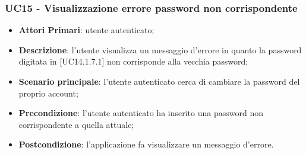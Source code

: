 \subsubsection{UC15 - Visualizzazione errore password non corrispondente}
\begin{itemize}
	\item \textbf{Attori Primari}: utente autenticato;
	\item \textbf{Descrizione}: l'utente visualizza un messaggio d'errore in quanto la password digitata in [UC14.1.7.1] non corrisponde alla vecchia password;
	\item \textbf{Scenario principale}: l'utente autenticato cerca di cambiare la password del proprio account;
	\item \textbf{Precondizione}: l'utente autenticato ha inserito una password non corrispondente a quella attuale;
	\item \textbf{Postcondizione}: l'applicazione fa visualizzare un messaggio d'errore.
\end{itemize}



